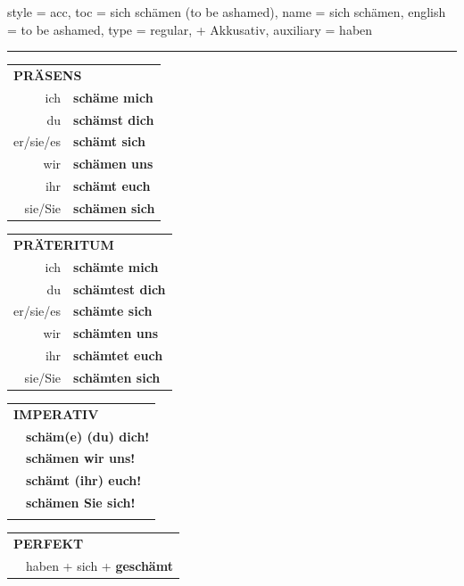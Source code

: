 \begin{verbentry}{
  style = {acc},
  toc = {sich schämen (to be ashamed)},
  name = {sich schämen},
  english = {to be ashamed},
  type = {regular, + Akkusativ},
  auxiliary = {haben}
}
 
    
       \vspace{5pt}

    \hrule
    
    \vspace{5pt}

  \begin{tabular}{rl}
     \multicolumn{2}{l}{\textbf{PRÄSENS} }\\
    ich & \textbf{schäme mich}\\
    du & \textbf{schämst dich}\\
    er/sie/es & \textbf{schämt sich}\\
    wir & \textbf{schämen uns}\\
    ihr & \textbf{schämt euch}\\
    sie/Sie & \textbf{schämen sich}\\
  \end{tabular}
  \hfill
     \begin{tabular}{rl}
    \multicolumn{2}{l}{\textbf{PRÄTERITUM} }\\
    ich & \textbf{schämte mich}\\
    du & \textbf{schämtest dich}\\
    er/sie/es & \textbf{schämte sich}\\
    wir & \textbf{schämten uns}\\
    ihr & \textbf{schämtet euch}\\
    sie/Sie & \textbf{schämten sich}\\
  \end{tabular}
  \hfill
  \begin{tabular}{rl}
     \multicolumn{2}{l}{\textbf{IMPERATIV} }\\
   & \textbf{schäm(e) (du) dich!}\\
   & \textbf{schämen wir uns!}\\
   & \textbf{schämt (ihr) euch!}\\
   & \textbf{schämen Sie sich!}\\
   & \vspace{10pt}
  \end{tabular}

    \vspace{10pt}

 \begin{tabular}{rl}
     \multicolumn{2}{l}{\textbf{PERFEKT}}\\
    &haben + sich + \textbf{geschämt}\\
  \end{tabular}
\hfill
   \begin{tabular}{rl}
   

\end{tabular}
\end{verbentry}
